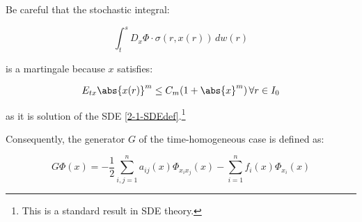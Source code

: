\begin{remark}
    Be careful that the stochastic integral:

    \[\int_t^s D_x\Phi\cdot\sigma(r,x(r))\,dw(r)\]

    is a martingale because $x$ satisfies:

    \[E_{tx}\abs{x(r)}^m\leq C_m(1+\abs{x}^m)\,\forall r\in I_0\]

    as it is solution of the SDE \ref{2-1-SDEdef}.\footnote{This is a standard result in SDE theory.}
\end{remark}

Consequently, the generator $G$ of the time-homogeneous case is defined as:

\begin{equation}
    G\Phi(x) = -\frac{1}{2}\sum_{i,j=1}^n a_{ij}(x)\Phi_{x_ix_j}(x) - \sum_{i=1}^n f_i(x)\Phi_{x_i}(x)
\end{equation}